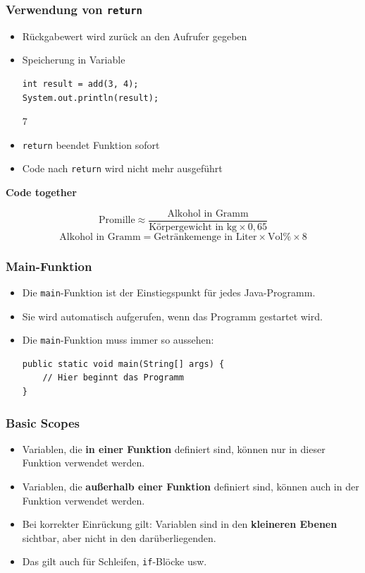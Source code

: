 \documentclass{../../presentation}
\begin{document}
\begin{frame}[fragile]
	\frametitle{Verwendung von \texttt{return}}

	\begin{itemize}
		\item\pause Rückgabewert wird zurück an den Aufrufer gegeben
		\item\pause Speicherung in Variable
		\begin{verbatim}
int result = add(3, 4);
System.out.println(result); 
		\end{verbatim}
\begin{ausgabe}
    7
\end{ausgabe}
		\item\pause \texttt{return} beendet Funktion sofort 
		\item\pause Code nach \texttt{return} wird nicht mehr ausgeführt
	\end{itemize}
\end{frame}


\begin{frame}[plain]
	\centering
	{\Huge\bfseries{Code together}}
	\begin{block}{}
		\[
			\text{Promille} \approx \frac{\text{Alkohol in Gramm}}{\text{Körpergewicht in kg} \times 0{,}65}
		\]
		\[
			\text{Alkohol in Gramm} = \text{Getränkemenge in Liter} \times \text{Vol\%} \times 8
		\]
	\end{block}
\end{frame}

\begin{frame}[fragile]
	\frametitle{Main-Funktion}
	\begin{itemize}
		\item Die \texttt{main}-Funktion ist der Einstiegspunkt für jedes Java-Programm.
		\item Sie wird automatisch aufgerufen, wenn das Programm gestartet wird.
		\item Die \texttt{main}-Funktion muss immer so aussehen:
		      \begin{verbatim}
public static void main(String[] args) {
    // Hier beginnt das Programm
}
\end{verbatim}
	\end{itemize}
\end{frame}

\begin{frame}[fragile]
	\frametitle{Basic Scopes}
	\begin{itemize}
		\item Variablen, die \textbf{in einer Funktion} definiert sind, können nur in dieser Funktion verwendet werden.
		\item Variablen, die \textbf{außerhalb einer Funktion} definiert sind, können auch in der Funktion verwendet werden.
		\item Bei korrekter Einrückung gilt: Variablen sind in den \textbf{kleineren Ebenen} sichtbar, aber nicht in den darüberliegenden.
		\item Das gilt auch für Schleifen, \texttt{if}-Blöcke usw.
	\end{itemize}
\end{frame}
\end{document}
